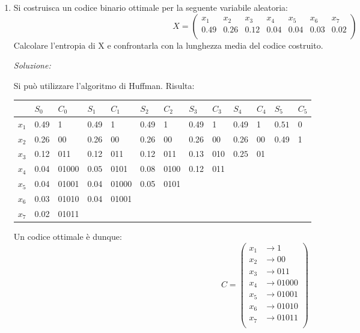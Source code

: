 \begin{enumerate}
       \bigskip

\item Si costruisca un codice binario ottimale per la seguente variabile aleatoria:
      \[ X = \left(
        \begin{array}{cccccccc}
           x_1  & x_2  & x_3  & x_4  & x_5  & x_6  & x_7\\
           0.49  & 0.26 & 0.12 & 0.04 & 0.04 & 0.03 & 0.02 \\
        \end{array} \right)
       \]
Calcolare l'entropia di X e confrontarla con la lunghezza media del codice costruito.
       \bigskip
       \bigskip

       \textit{Soluzione:}

       \noindent
       Si può utilizzare l'algoritmo di Huffman.
       Risulta:
       \begin{table}[htbp]
       \begin{center}
        \begin{tabular}{l || l|l|| l|l|| l|l|| l|l|| l|l|| l|l}
     &$S_0$ &$C_0$&$S_1$       & $C_1$& $S_2$        & $C_2$& $S_3$  & $C_3$& $S_4$      &$C_4$ & $S_5$ & $C_5$    \\
       \hline
$x_1$& 0.49&1   & 0.49          &1   &0.49          &1  &0.49          &1 &0.49          &1 &$\boxed{0.51}$& 0\\
$x_2$& 0.26&00  & 0.26          &00  &0.26          &00 &0.26          &00&0.26          &00&0.49 & 1\\
$x_3$& 0.12&011 & 0.12          &011 &0.12          &011&$\boxed{0.13}$&010&$\boxed{0.25}$&01&     &\\
$x_4$& 0.04&01000& $\boxed{0.05}$&0101&$\boxed{0.08}$&0100&0.12          &011& & & &\\
$x_5$& 0.04&01001& 0.04          &01000&0.05          &0101&              &  & & & &\\
$x_6$& 0.03&01010& 0.04          &01001&              &    &              &  & & & &\\
$x_7$& 0.02&01011&               &    &              &    &              &  & & & &\\
       \end{tabular}
       \end{center}
       \end{table} 

      Un codice ottimale è dunque:
       \[ C = \left(
        \begin{array}{cl}
           x_1  & \to 1 \\
           x_2  & \to 00 \\
           x_3  & \to 011 \\
           x_4  & \to 01000 \\
           x_5  & \to 01001 \\
           x_6  & \to 01010 \\
           x_7  & \to 01011  \\
        \end{array} \right)
       \]


\end{enumerate}
